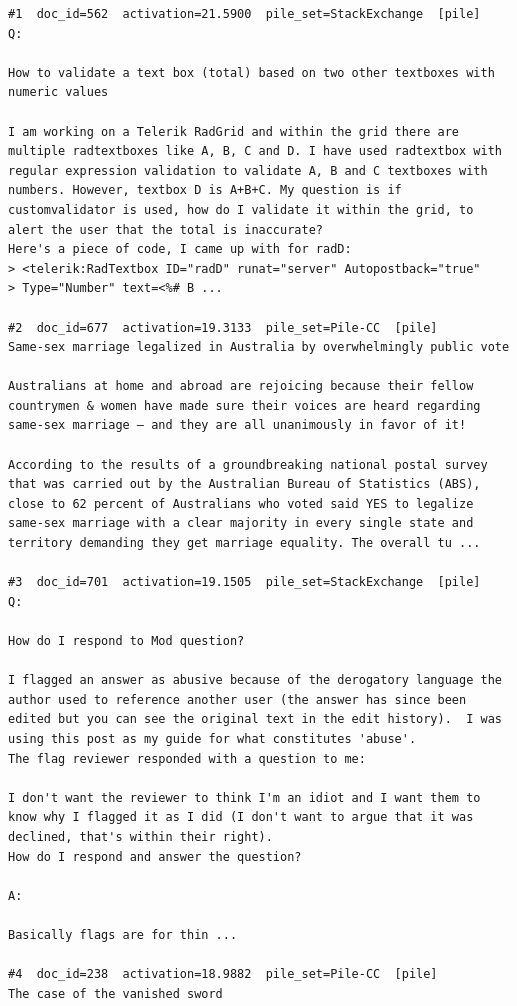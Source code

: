 \begin{verbatim}
#1  doc_id=562  activation=21.5900  pile_set=StackExchange  [pile]
Q:

How to validate a text box (total) based on two other textboxes with numeric values

I am working on a Telerik RadGrid and within the grid there are multiple radtextboxes like A, B, C and D. I have used radtextbox with regular expression validation to validate A, B and C textboxes with numbers. However, textbox D is A+B+C. My question is if customvalidator is used, how do I validate it within the grid, to alert the user that the total is inaccurate?
Here's a piece of code, I came up with for radD:
> <telerik:RadTextbox ID="radD" runat="server" Autopostback="true"
> Type="Number" text=<%# B ...

#2  doc_id=677  activation=19.3133  pile_set=Pile-CC  [pile]
Same-sex marriage legalized in Australia by overwhelmingly public vote

Australians at home and abroad are rejoicing because their fellow countrymen & women have made sure their voices are heard regarding same-sex marriage — and they are all unanimously in favor of it!

According to the results of a groundbreaking national postal survey that was carried out by the Australian Bureau of Statistics (ABS), close to 62 percent of Australians who voted said YES to legalize same-sex marriage with a clear majority in every single state and territory demanding they get marriage equality. The overall tu ...

#3  doc_id=701  activation=19.1505  pile_set=StackExchange  [pile]
Q:

How do I respond to Mod question?

I flagged an answer as abusive because of the derogatory language the author used to reference another user (the answer has since been edited but you can see the original text in the edit history).  I was using this post as my guide for what constitutes 'abuse'.
The flag reviewer responded with a question to me:

I don't want the reviewer to think I'm an idiot and I want them to know why I flagged it as I did (I don't want to argue that it was declined, that's within their right).
How do I respond and answer the question?

A:

Basically flags are for thin ...

#4  doc_id=238  activation=18.9882  pile_set=Pile-CC  [pile]
The case of the vanished sword


\end{verbatim}
